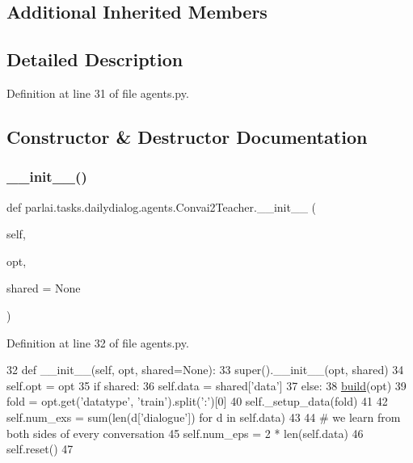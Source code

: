 \subsection*{Additional Inherited Members}


\subsection{Detailed Description}


Definition at line 31 of file agents.\+py.



\subsection{Constructor \& Destructor Documentation}
\mbox{\label{classparlai_1_1tasks_1_1dailydialog_1_1agents_1_1Convai2Teacher_a8dede379600bb9f0e942059ea2b0d9f0}} 
\subsubsection{\texorpdfstring{\+\_\+\+\_\+init\+\_\+\+\_\+()}{\_\_init\_\_()}}
{\footnotesize\ttfamily def parlai.\+tasks.\+dailydialog.\+agents.\+Convai2\+Teacher.\+\_\+\+\_\+init\+\_\+\+\_\+ (\begin{DoxyParamCaption}\item[{}]{self,  }\item[{}]{opt,  }\item[{}]{shared = {\ttfamily None} }\end{DoxyParamCaption})}



Definition at line 32 of file agents.\+py.


\begin{DoxyCode}
32     \textcolor{keyword}{def }\_\_init\_\_(self, opt, shared=None):
33         super().\_\_init\_\_(opt, shared)
34         self.opt = opt
35         \textcolor{keywordflow}{if} shared:
36             self.data = shared[\textcolor{stringliteral}{'data'}]
37         \textcolor{keywordflow}{else}:
38             \hyperlink{namespaceparlai_1_1mturk_1_1tasks_1_1talkthewalk_1_1download_a8c0fbb9b6dfe127cb8c1bd6e7c4e33fd}{build}(opt)
39             fold = opt.get(\textcolor{stringliteral}{'datatype'}, \textcolor{stringliteral}{'train'}).split(\textcolor{stringliteral}{':'})[0]
40             self.\_setup\_data(fold)
41 
42         self.num\_exs = sum(len(d[\textcolor{stringliteral}{'dialogue'}]) \textcolor{keywordflow}{for} d \textcolor{keywordflow}{in} self.data)
43 
44         \textcolor{comment}{# we learn from both sides of every conversation}
45         self.num\_eps = 2 * len(self.data)
46         self.reset()
47 
\end{DoxyCode}


